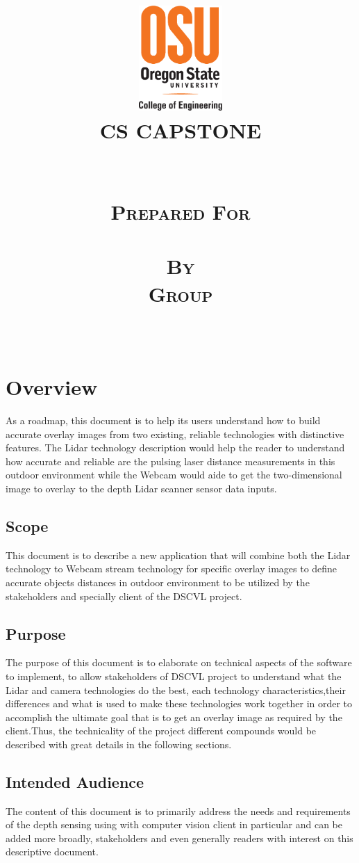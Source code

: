 \documentclass[10pt,draftclsnofoot,onecolumn,journal,compsoc]{IEEEtran}
\date{\displaydate{date}}
\title{\centering
			\includegraphics[height=4cm,natwidth=200,natheight=300]{images/osu_logo.png}\\\vspace{.5in}
		\scshape{\huge CS CAPSTONE \DocType \\\vspace{.5in}
		\textbf{\Huge\CapstoneProjectName}\\\vspace{1in}
		\large	\displaydate{date}\\\vspace{.2in}		
			\large {Prepared For}\\\vspace{.1in}
			\textbf{{\Large \CapstoneSponsorPerson}} \\\vspace{.8in}		
				\large {By} \\\vspace{.1in}
				\textbf {Group \CapstoneTeamNumber}\\\vspace{.1in}
				\Large {\CapstoneTeamName}\\\vspace{.1in}
				\textbf{ { \GroupMemberTwo}}
}  
}
\begin{document}
 \maketitle
\IEEEdisplaynontitleabstractindextext
\IEEEpeerreviewmaketitle
\newpage
{}
\tableofcontents
\newpage

\section{Overview}
As a roadmap, this document is to help its users understand how to build accurate overlay images from two existing, reliable technologies with distinctive features. The Lidar technology description would help the reader to understand how accurate and reliable are the pulsing laser distance measurements in this outdoor environment while the Webcam would aide to get the two-dimensional image to overlay to the depth Lidar scanner sensor data inputs.
\subsection{Scope}
This document is to describe a new application that will combine both the Lidar technology to Webcam stream technology for specific overlay images to define accurate objects distances in outdoor environment to be utilized by the stakeholders  and specially client of the DSCVL project.

\subsection{Purpose}
The purpose of this document is to elaborate on technical aspects of the software to implement, to allow stakeholders of DSCVL project to understand what the Lidar and camera  technologies do the best, each technology characteristics,their differences and what is used to make these technologies work together in order to accomplish the ultimate goal that is to get an overlay image as required by the client.Thus, the technicality of the project different compounds would be described with great details  in the following sections. 

\subsection{Intended Audience}
 The content of this document is to primarily address the needs and requirements of the depth sensing using with computer vision client in particular and can be added more broadly, stakeholders  and even generally readers with interest on this descriptive document.
\end{document}
